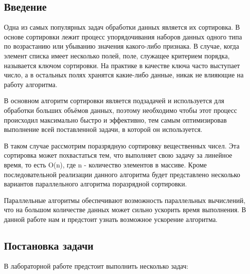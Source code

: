 \documentclass{report}
\begin{document}
\setcounter{page}{2}

\tableofcontents
\newpage

\begin{center}\section*{Введение}\end{center}
\par Одна из самых популярных задач обработки данных является их сортировка. В основе сортировки лежит процесс упорядочивания наборов данных одного типа по возрастанию или убыванию значения какого-либо признака. В случае, когда элемент списка имеет несколько полей, поле, служащее критерием порядка, называется ключом сортировки. На практике в качестве ключа часто выступает число, а в остальных полях хранятся какие-либо данные, никак не влияющие на работу алгоритма.
\par В основном алгоритм сортировки является подзадачей и используется для обработки больших объёмов данных, поэтому необходимо чтобы этот процесс происходил максимально быстро и эффективно, тем самым оптимизировав выполнение всей поставленной задачи, в которой он используется.
\par В таком случае рассмотрим поразрядную сортировку вещественных чисел. Эта сортировка может похвастаться тем, что выполняет свою задачу за линейное время, то есть O(n), где n - количество элементов в массиве. Кроме последовательной реализации данного алгоритма будет представлено несколько вариантов параллельного алгоритма поразрядной сортировки.
\par Параллельные алгоритмы обеспечивают возможность параллельных вычислений, что на большом количестве данных может сильно ускорить время выполнения. В данной работе нам и предстоит узнать возможное ускорение алгоритма.
\newpage

\begin{center}\section*{Постановка задачи}\end{center}

В лабораторной работе предстоит выполнить несколько задач:
\end{document}
